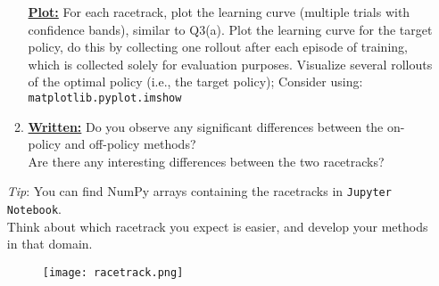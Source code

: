 \documentclass{article}
\begin{document}
\begin{enumerate}
\begin{enumerate}
		            \uline{\textbf{Plot:}} For each racetrack, plot the learning curve (multiple trials with confidence bands), similar to Q3(a). Plot the learning curve for the target policy, do this by collecting one rollout after each episode of training, which is collected solely for evaluation purposes. Visualize several rollouts of the optimal policy (i.e., the target policy); Consider using: \texttt{matplotlib.pyplot.imshow}
		      \item \uline{\textbf{Written:}} Do you observe any significant differences between the on-policy and off-policy methods? \\
		            Are there any interesting differences between the two racetracks?
	      \end{enumerate}
	      \textit{Tip}: You can find NumPy arrays containing the racetracks in \texttt{Jupyter Notebook}. \\
	      Think about which racetrack you expect is easier, and develop your methods in that domain.
	      
	      \begin{figure} [h]
		      \begin{center}
			      \texttt{[image: racetrack.png]}
		      \end{center}
	      \end{figure}

\end{enumerate}
\end{document}
